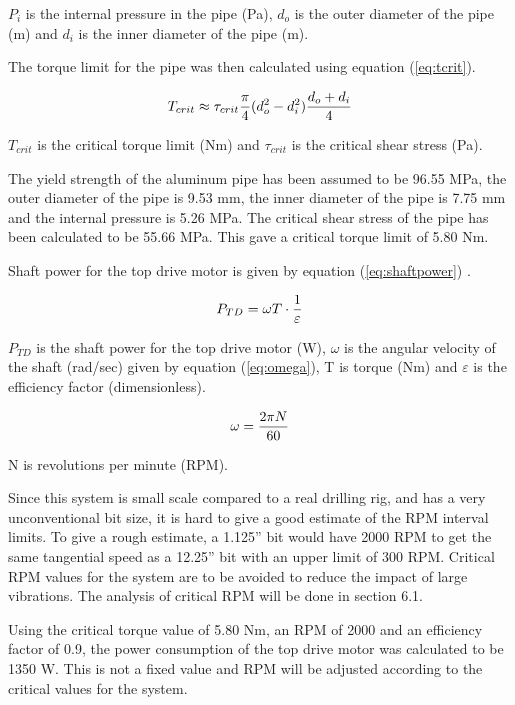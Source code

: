 $P_i$ is the internal pressure in the pipe (Pa), $d_o$ is the outer diameter of the pipe (m) and $d_i$ is the inner diameter of the pipe (m). 

The torque limit for the pipe was then calculated using equation (\ref{eq:tcrit}).

\begin{equation}
\centering
   T_{crit} \approx \tau_{crit} \frac{\pi}{4} (d_o^2-d_i^2)\frac{d_o+d_i}{4}
\label{eq:tcrit}
\end{equation}

$T_{crit}$ is the critical torque limit (Nm) and $\tau_{crit}$ is the critical shear stress (Pa).

The yield strength of the aluminum pipe has been assumed to be 96.55 MPa, the outer diameter of the pipe is 9.53 mm, the inner diameter of the pipe is 7.75 mm and the internal pressure is 5.26 MPa. The critical shear stress of the pipe has been calculated to be 55.66 MPa. This gave a critical torque limit of 5.80 Nm. 

Shaft power for the top drive motor is given by equation (\ref{eq:shaftpower}) \cite{bourg}.

\begin{equation}
\centering
   P_{TD}=\omega T \cdot \frac{1}{\varepsilon}
\label{eq:shaftpower}
\end{equation}

$P_{TD}$ is the shaft power for the top drive motor (W), $\omega$ is the angular velocity of the shaft (rad/sec) given by equation (\ref{eq:omega}), T is torque (Nm) and $\varepsilon$ is the efficiency factor (dimensionless).

\begin{equation}
\centering
   \omega=\frac{2\pi N}{60}
\label{eq:omega}
\end{equation}

N is revolutions per minute (RPM). 

Since this system is small scale compared to a real drilling rig, and has a very unconventional bit size, it is hard to give a good estimate of the RPM interval limits. To give a rough estimate, a 1.125” bit would have 2000 RPM to get the same tangential speed as a 12.25” bit with an upper limit of 300 RPM. Critical RPM values for the system are to be avoided to reduce the impact of large vibrations. The analysis of critical RPM will be done in section 6.1. 

Using the critical torque value of 5.80 Nm, an RPM of 2000 and an efficiency factor of 0.9, the power consumption of the top drive motor was calculated to be 1350 W. This is not a fixed value and RPM will be adjusted according to the critical values for the system.

